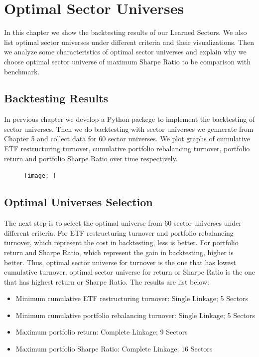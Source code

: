 \documentclass[../main.tex]{subfiles}
\begin{document}
    
\chapter{Optimal Sector Universes}

In this chapter we show the backtesting results of our Learned Sectors. We also list optimal sector universes under different criteria and their visualizations. Then we analyze some characteristics of optimal sector universes and explain why we choose optimal sector universe of maximum Sharpe Ratio to be comparison with benchmark. 

\section{Backtesting Results}

In pervious chapter we develop a Python packege to implement the backtesting of sector universes. Then we do backtesting with sector universes we gennerate from Chapter 5 and collect data for 60 sector universes. We plot graphs of cumulative ETF restructuring turnover, cumulative portfolio rebalancing turnover, portfolio return and portfolio Sharpe Ratio over time respectively. 

\begin{figure}[H]
    \texttt{[image: ]}
    \caption{}
    \label{}
\end{figure} 

\section{Optimal Universes Selection}

The next step is to select the optimal universe from 60 sector universes under different criteria. For ETF restructuring turnover and portfolio rebalancing turnover, which represent the cost in backtesting, less is better. For portfolio return and Sharpe Ratio, which represent the gain in backtesting, higher is better. Thus, optimal sector universe for turnover is the one that has lowest cumulative turnover. optimal sector universe for return or Sharpe Ratio is the one that has highest return or Sharpe Ratio. The results are list below: 

\begin{itemize}
	\item Minimum cumulative ETF restructuring turnover: Single Linkage; 5 Sectors
	\item Minimum cumulative portfolio rebalancing turnover: Single Linkage; 5 Sectors
	\item Maximum portfolio return: Complete Linkage; 9 Sectors
	\item Maximum portfolio Sharpe Ratio: Complete Linkage; 16 Sectors
\end{itemize}
    
\end{document}
